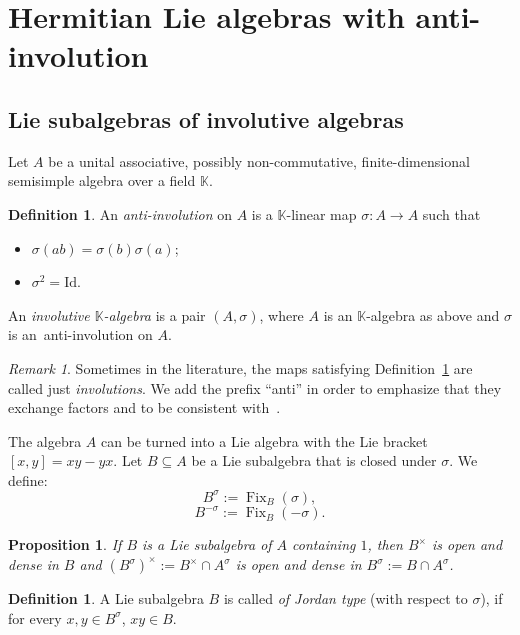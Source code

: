 \documentclass[a4paper,oneside,11pt]{amsart}
\DeclareMathOperator{\Fix}{Fix}
\theoremstyle{plain}
\newtheorem{prop}[teo]{Proposition}
\theoremstyle{definition}
\newtheorem{df}[teo]{Definition}
\theoremstyle{remark}
\newtheorem{rem}[teo]{Remark}
\newcommand{\defin}{\emph}
\begin{document}
\section{Hermitian Lie algebras with anti-involution}\label{B-case}

\subsection{Lie subalgebras of involutive algebras}

Let $A$ be a unital associative, possibly non-commutative, finite-dimensional semisimple algebra over a field $\mathbb K$.

\begin{df}\label{def:antiinv}
An \emph{anti-involution} on $A$ is a $\mathbb{K}$-linear map $\sigma\colon A\to A$ such that
\begin{itemize}
\item $\sigma(ab)=\sigma(b)\sigma(a)$;
\item $\sigma^2=\mathrm{Id}$.
\end{itemize}
An \emph{involutive $\mathbb{K}$-algebra} is a pair $(A,\sigma)$, where $A$ is an $\mathbb{K}$-algebra as above and $\sigma$ is an~anti-involution on $A$.
\end{df}

\begin{rem}
Sometimes in the literature, the maps satisfying Definition~\ref{def:antiinv} are called just \emph{involutions}. We add the prefix ``anti'' in order to emphasize that they exchange factors and to be consistent with~\cite{ABRRW,R-Thesis,HKRW}.
\end{rem}


\noindent The algebra $A$ can be turned into a Lie algebra with the Lie bracket $[x,y]=xy-yx$. Let $B\subseteq A$ be a Lie subalgebra that is closed under $\sigma$. We define:
$$B^{\sigma}:=\Fix_B(\sigma),$$
$$B^{-\sigma}:=\Fix_B(-\sigma).$$

\begin{prop}{\rm \cite[Proposition~2.30]{ABRRW}} If $B$ is a Lie subalgebra of $A$ containing $1$, then $B^\times$ is open and dense in $B$ and $(B^{\sigma})^\times:=B^\times\cap A^{\sigma}$ is open and dense in $B^{\sigma}:=B\cap A^{\sigma}$.
\end{prop}


\begin{df}\label{df:JordanType}
A Lie subalgebra $B$ is called \defin{of Jordan type} (with respect to $\sigma$), if for every $x,y\in B^{\sigma}$, $xy\in B$.
\end{df}
\end{document}
